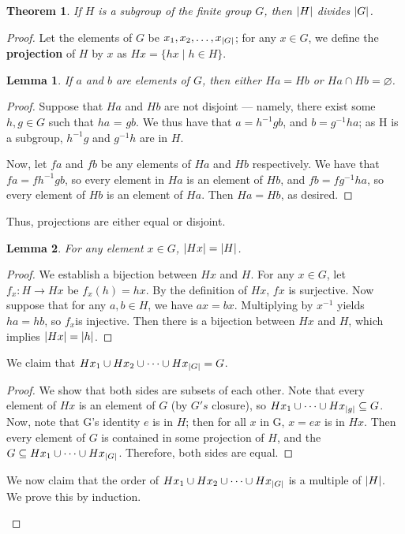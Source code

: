 \documentclass[11pt]{article}
\newtheorem{theorem}{Theorem}
\newtheorem{lemma}{Lemma}
\begin{document}
\begin{theorem}
	If $H$ is a subgroup of the finite group $G$, then $\abs{H}$ divides $\abs{G}$.
\end{theorem}
\begin{proof}
	Let the elements of $G$ be $x_{1}, x_{2}, \ldots, x_{\abs{G}}$; for any $x \in G$, we define the \textbf{projection} of $H$ by $x$ as $Hx = \{ hx \mid h \in H \}$.
	\begin{adjustwidth}{1cm}{}
		\begin{lemma}
			If $a$ and $b$ are elements of $G$, then either $Ha = Hb$ or $Ha \cap Hb = \varnothing$.
		\end{lemma}
		\begin{proof}\renewcommand{\qedsymbol}{}
			Suppose that $Ha$ and $Hb$ are not disjoint --- namely, there exist some $h, g \in G$ such that $ha$ = $gb$. We thus have that $a = h^{-1}gb$, and $b = g^{-1}ha$; as H is a subgroup, $h^{-1}g$ and $g^{-1}h$ are in $H$.

			Now, let $fa$ and $fb$ be any elements of $Ha$ and $Hb$ respectively. We have that $fa = fh^{-1}gb$, so every element in $Ha$ is an element of $Hb$, and $fb = fg^{-1}ha$, so every element of $Hb$ is an element of $Ha$. Then $Ha = Hb$, as desired.
		\end{proof}
	\end{adjustwidth}
	Thus, projections are either equal or disjoint.
	\begin{adjustwidth}{1cm}{}
		\begin{lemma}
			For any element $x \in G$, $\abs{Hx} = \abs{H}$.
		\end{lemma}
		\begin{proof}\renewcommand{\qedsymbol}{}
			We establish a bijection between $Hx$ and $H$. For any $x \in G$, let $f_{x} :H \to Hx$ be $f_{x}(h) = hx$. By the definition of $Hx$, $fx$ is surjective. Now suppose that for any $a, b \in H$, we have $ax = bx$. Multiplying by $x^{-1}$ yields $ha = hb$, so $f_{x} $is injective. Then there is a bijection between $Hx$ and $H$, which implies $\abs{Hx} = \abs{h}$.
		\end{proof}
	\end{adjustwidth}
	We claim that $Hx_{1} \cup Hx_{2} \cup \cdots \cup Hx_{\abs{G}} = G$.
	\begin{adjustwidth}{1cm}{}
		\begin{proof}\renewcommand{\qedsymbol}{}
			We show that both sides are subsets of each other. Note that every element of $Hx$ is an element of $G$ (by $G's$ closure), so $Hx_{1} \cup \cdots \cup Hx_{\abs{g}} \subseteq G$. Now, note that G's identity $e$ is in $H$; then for all $x$ in G, $x = ex$ is in $Hx$. Then every element of $G$ is contained in some projection of $H$, and the $G \subseteq Hx_{1} \cup \cdots \cup Hx_{\abs{G}}$. Therefore, both sides are equal.
		\end{proof}
	\end{adjustwidth}
	We now claim that the order of $Hx_{1} \cup Hx_{2} \cup \cdots \cup Hx_{\abs{G}}$ is a multiple of $\abs{H}$. We prove this by induction.
	\begin{adjustwidth}{1cm}{}


\end{adjustwidth}
\end{proof}
\end{document}
